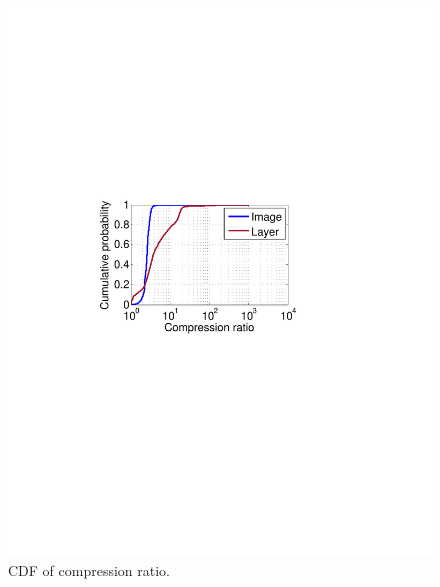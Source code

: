\begin{figure}[t]
\begin{minipage}{0.22\textwidth}
		\includegraphics[width=1\textwidth]{graphs/compress-ratio-cdf.pdf}
		\caption{CDF of compression ratio.}
		\label{fig:compress-ratio}
	\end{minipage}
\end{figure}
